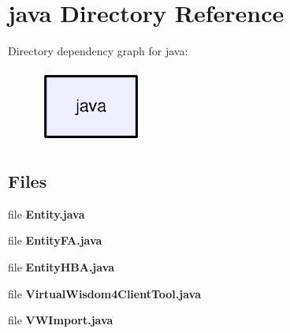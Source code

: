 \section{java Directory Reference}
\label{dir_93c6ba7fb77bae0709fae89c9c13b44a}
Directory dependency graph for java\-:\nopagebreak
\begin{figure}[H]
\begin{center}
\leavevmode
\includegraphics[width=98pt]{dir_93c6ba7fb77bae0709fae89c9c13b44a_dep}
\end{center}
\end{figure}
\subsection*{Files}
\begin{DoxyCompactItemize}
\item 
file {\bf Entity.\-java}
\item 
file {\bf Entity\-F\-A.\-java}
\item 
file {\bf Entity\-H\-B\-A.\-java}
\item 
file {\bf Virtual\-Wisdom4\-Client\-Tool.\-java}
\item 
file {\bf V\-W\-Import.\-java}
\end{DoxyCompactItemize}
